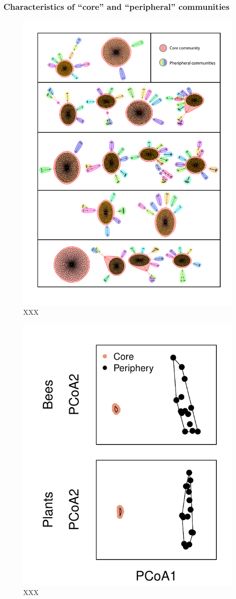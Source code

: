 \documentclass[12pt]{article}
\begin{document}
\subsubsection*{Characteristics of ``core'' and ``peripheral''
  communities}

\begin{figure}
  \centering
  \includegraphics[width=.8\textwidth]{../analysis/changePoint/plotting/communities.pdf}
  \caption{XXX}
  \label{fig:communities}
\end{figure}
\clearpage

\begin{figure}
  \centering
  \includegraphics[width=.7\textwidth]{../analysis/changePoint/plotting/figures/pcoa/pcoa.pdf}
  \caption{XXX}
  \label{fig:pcoa}
\end{figure}
\clearpage
\end{document}
